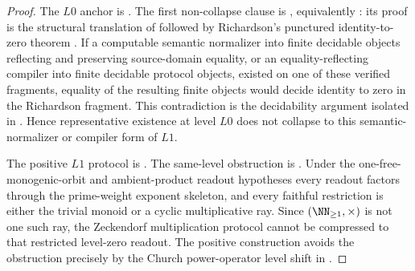 \begin{proof}
The \(L0\) anchor is .  The first non-collapse clause
is , equivalently
: its proof is the structural translation of
 followed by Richardson's punctured
identity-to-zero theorem .  If a computable
semantic normalizer into finite decidable objects reflecting and preserving
source-domain equality, or an equality-reflecting compiler into finite decidable
protocol objects, existed on one of these verified fragments, equality of the
resulting finite objects would decide identity to zero in the Richardson
fragment.  This contradiction is the decidability
argument isolated in .  Hence representative existence
at level \(L0\) does not collapse to this semantic-normalizer or compiler form of
\(L1\).

The positive \(L1\) protocol is
.  The
same-level obstruction is .  Under the
one-free-monogenic-orbit and ambient-product readout hypotheses every readout
factors through the prime-weight exponent skeleton, and every faithful
restriction is either the trivial monoid or a cyclic multiplicative ray.  Since
\((\NN_{\ge1},\times)\) is not one such ray, the Zeckendorf multiplication
protocol cannot be compressed to that restricted level-zero readout.  The
positive construction avoids the obstruction precisely by the Church
power-operator level shift in .


\end{proof}
